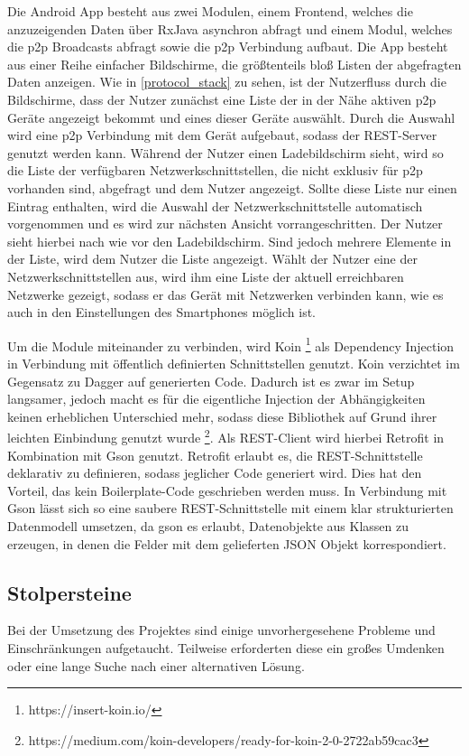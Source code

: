 		Die Android App besteht aus zwei Modulen, einem Frontend, welches die anzuzeigenden Daten über RxJava asynchron abfragt und einem Modul, welches die p2p Broadcasts abfragt sowie die p2p Verbindung aufbaut.
		Die App besteht aus einer Reihe einfacher Bildschirme, die größtenteils bloß Listen der abgefragten Daten anzeigen. Wie in \figurename \ref{protocol_stack} zu sehen, ist der Nutzerfluss durch die Bildschirme, dass der Nutzer zunächst eine Liste der in der Nähe aktiven p2p Geräte angezeigt bekommt und eines dieser Geräte auswählt. Durch die Auswahl wird eine p2p Verbindung mit dem Gerät aufgebaut, sodass der REST-Server genutzt werden kann. Während der Nutzer einen Ladebildschirm sieht, wird so die Liste der verfügbaren Netzwerkschnittstellen, die nicht exklusiv für p2p vorhanden sind, abgefragt und dem Nutzer angezeigt. Sollte diese Liste nur einen Eintrag enthalten, wird die Auswahl der Netzwerkschnittstelle automatisch vorgenommen und es wird zur nächsten Ansicht vorrangeschritten. Der Nutzer sieht hierbei nach wie vor den Ladebildschirm. Sind jedoch mehrere Elemente in der Liste, wird dem Nutzer die Liste angezeigt. Wählt der Nutzer eine der Netzwerkschnittstellen aus, wird ihm eine Liste der aktuell erreichbaren Netzwerke gezeigt, sodass er das Gerät mit Netzwerken verbinden kann, wie es auch in den Einstellungen des Smartphones möglich ist.
		
		Um die Module miteinander zu verbinden, wird Koin \footnote{https://insert-koin.io/} als Dependency Injection in Verbindung mit öffentlich definierten Schnittstellen genutzt. Koin verzichtet im Gegensatz zu Dagger auf generierten Code. Dadurch ist es zwar im Setup langsamer, jedoch macht es für die eigentliche Injection der Abhängigkeiten keinen erheblichen Unterschied mehr, sodass diese Bibliothek auf Grund ihrer leichten Einbindung genutzt wurde \footnote{https://medium.com/koin-developers/ready-for-koin-2-0-2722ab59cac3}. Als REST-Client wird hierbei Retrofit in Kombination mit Gson genutzt. Retrofit erlaubt es, die REST-Schnittstelle deklarativ zu definieren, sodass jeglicher Code generiert wird. Dies hat den Vorteil, das kein Boilerplate-Code geschrieben werden muss. In Verbindung mit Gson lässt sich so eine saubere REST-Schnittstelle mit einem klar strukturierten Datenmodell umsetzen, da gson es erlaubt, Datenobjekte aus Klassen zu erzeugen, in denen die Felder mit dem gelieferten JSON Objekt korrespondiert.

	\subsection{Stolpersteine}
		Bei der Umsetzung des Projektes sind einige unvorhergesehene Probleme und Einschränkungen aufgetaucht. Teilweise erforderten diese ein großes Umdenken oder eine lange Suche nach einer alternativen Lösung.
		
